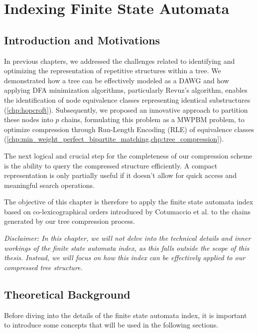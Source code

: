 \chapter{Indexing Finite State Automata}
\section{Introduction and Motivations}
In previous chapters, we addressed the challenges related to identifying and optimizing the representation of repetitive structures within a tree. We demonstrated how a tree can be effectively modeled as a DAWG and how applying DFA minimization algorithms, particularly Revuz's algorithm, enables the identification of node equivalence classes representing identical substructures (\cref{chp:hopcroft}). Subsequently, we proposed an innovative approach to partition these nodes into $p$ chains, formulating this problem as a MWPBM problem, to optimize compression through Run-Length Encoding (RLE) of equivalence classes (\cref{chp:min_weight_perfect_bipartite_matching,chp:tree_compression}).

The next logical and crucial step for the completeness of our compression scheme is the ability to query the compressed structure efficiently. A compact representation is only partially useful if it doesn't allow for quick access and meaningful search operations.

The objective of this chapter is therefore to apply the finite state automata index based on co-lexicographical orders introduced by Cotumaccio et al. \cite{cotumaccio2023co} to the chains generated by our tree compression process.

\textit{Disclaimer: In this chapter, we will not delve into the technical details and inner workings of the finite state automata index, as this falls outside the scope of this thesis. Instead, we will focus on how this index can be effectively applied to our compressed tree structure.}

\section{Theoretical Background}
Before diving into the details of the finite state automata index, it is important to introduce some concepts that will be used in the following sections.

